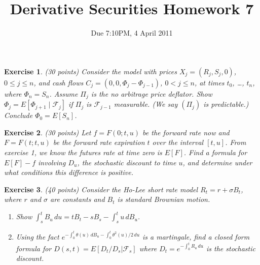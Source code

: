 \documentclass[11pt,fleqn]{amsproc}
\newcommand{\F}{\mathcal{F}}
\newtheorem{xca}{Exercise}
\begin{document}
\title{Derivative Securities Homework 7}
\author{Due 7:10PM, 4 April 2011}

\maketitle

\begin{xca}{(30 points)}
Consider the model with prices $X_j = (R_j, S_j, 0)$, $0\le j\le n$,
and cash flows $C_j = (0, 0, \Phi_j - \Phi_{j-1})$, $0 < j\le n$,
at times $t_0$, \dots, $t_n$, where $\Phi_n = S_n$.
Assume $\Pi_j$
is the no arbitrage price deflator.
Show $\Phi_j = E[\Phi_{j+1}\mid \F_j]$ if $\Pi_j$ is
$\F_{j-1}$ measurable. (We say $(\Pi_j)$ is {\em predictable}.)
Conclude $\Phi_0 = E[S_n]$.
\end{xca}

\begin{xca}{(30 points)}
Let $f = F(0;t,u)$ be the forward rate now and $F = F(t;t,u)$
be the forward rate expiration $t$ over the interval $[t,u]$.
From exercise 1, we know the futures rate at time zero is
$E[F]$. Find a formula for $E[F] - f$ involving $D_u$, the
stochastic discount to time $u$, and determine
under what conditions this difference is positive.
\end{xca}

\begin{xca}{(40 points)}
Consider the Ho-Lee short rate model $R_t = r + \sigma B_t$, where $r$
and $\sigma$ are constants and $B_t$ is standard Brownian motion.
\begin{enumerate}
\item Show $\int_s^t B_u\,du = tB_t - sB_s - \int_s^t u\,dB_u$.
\item Using the fact $e^{-\int_0^t\theta(u)\,dB_u - \int_0^t\theta^2(u)/2\,du}$
is a martingale, find a closed form formula for
$D(s,t) = E[D_t/D_s|\F_s]$ where $D_t = e^{-\int_0^t R_u\,du}$ is
the stochastic discount.
\end{enumerate}
\end{xca}
\end{document}
